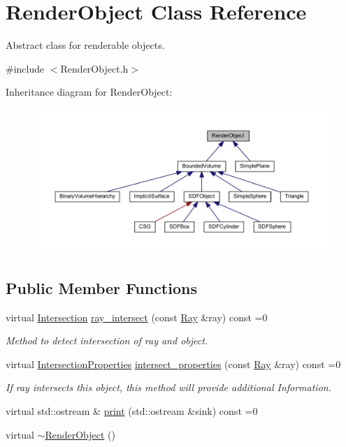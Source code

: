 \hypertarget{classRenderObject}{}\section{Render\+Object Class Reference}
\label{classRenderObject}


Abstract class for renderable objects.  




{\ttfamily \#include $<$Render\+Object.\+h$>$}



Inheritance diagram for Render\+Object\+:
\nopagebreak
\begin{figure}[H]
\begin{center}
\leavevmode
\includegraphics[width=350pt]{classRenderObject__inherit__graph}
\end{center}
\end{figure}
\subsection*{Public Member Functions}
\begin{DoxyCompactItemize}
\item 
virtual \mbox{\hyperlink{classIntersection}{Intersection}} \mbox{\hyperlink{classRenderObject_aa844ad2c5ef0c2b79faef2ed0af553bb}{ray\+\_\+intersect}} (const \mbox{\hyperlink{classRay}{Ray}} \&ray) const =0
\begin{DoxyCompactList}\small\item\em Method to detect intersection of ray and object. \end{DoxyCompactList}\item 
virtual \mbox{\hyperlink{classIntersectionProperties}{Intersection\+Properties}} \mbox{\hyperlink{classRenderObject_a792d36570e3264530872187ca1b0baca}{intersect\+\_\+properties}} (const \mbox{\hyperlink{classRay}{Ray}} \&ray) const =0
\begin{DoxyCompactList}\small\item\em If ray intersects this object, this method will provide additional Information. \end{DoxyCompactList}\item 
virtual std\+::ostream \& \mbox{\hyperlink{classRenderObject_a7a7f1168a7d96ca95235b170ff7fb11b}{print}} (std\+::ostream \&sink) const =0
\item 
virtual \mbox{\hyperlink{classRenderObject_ac4b49b10f81b6bd12d9a25f4d929d9d8}{$\sim$\+Render\+Object}} ()
\end{DoxyCompactItemize}


